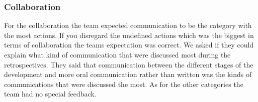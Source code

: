 \subsubsection{Collaboration}
For the collaboration the team expected communication to be the category with the most actions. If you disregard the undefined actions which was the biggest in terms of collaboration the teams expectation was correct. We asked if they could explain what kind of communication that were discussed most during the retrospectives. They said that communication between the different stages of the development and more oral communication rather than written was the kinds of communications that were discussed the most. As for the other categories the team had no special feedback. 